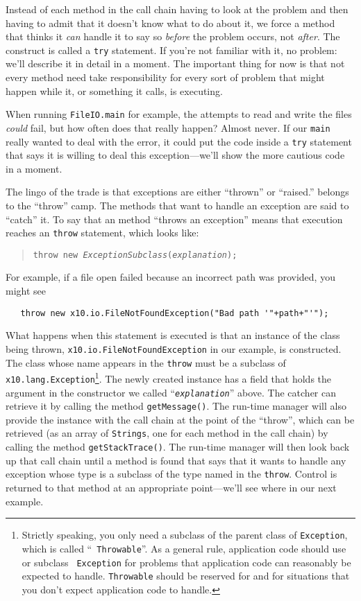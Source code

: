 Instead of each method in the call chain having to look at the
problem and then having to admit that it doesn't know what to do
about it, we force a method that thinks it {\em can} handle it to say so {\em before}
the problem occurs, not {\em after}. The
construct is called a {\tt try} statement.  If you're not familiar with
it, no problem: we'll describe it in detail in a moment.  The important thing
for now is that not every method need take responsibility for every sort of
problem that might happen while it, or something it calls, is executing.

When running {\tt FileIO.main} for example, the attempts to read and write the
files {\em could} fail, but how often does that really happen? Almost never.
If our {\tt main} really wanted to deal with the
error, it could put the code inside a {\tt try} statement that says it is
willing to deal this exception---we'll show the more cautious code in a
moment.

The lingo of the trade is that exceptions are either ``thrown'' or ``raised.'' 
\Xten{} belongs to the ``throw'' camp.  The methods that want to handle an
exception are said to ``catch'' it.
To say that an \Xten{} method ``throws an exception'' means that execution
reaches an \Xten{} {\tt throw} statement, which looks like:
\begin{quote}
{\tt throw new {\em ExceptionSubclass}({\em explanation});}
\end{quote}
For example, if a file open failed because an incorrect path was provided, you
might see
\begin{verbatim}
   throw new x10.io.FileNotFoundException("Bad path '"+path+"'");
\end{verbatim}
What happens when this statement is executed is that an instance of the
class being thrown, {\tt x10.io.FileNotFoundException} in our example,
is constructed.  The class whose name appears in the {\tt throw} must be a
subclass of {\tt x10.lang.Exception}\footnote{Strictly speaking,  you only need
a subclass of the parent class of {\tt Exception}, which is called ``{\tt
Throwable}''.  As a general rule, application code should use or subclass {\tt
Exception} for problems that application code can reasonably be expected to
handle.  {\tt Throwable} should be reserved for \Xten{} and for situations that
you don't expect application code to handle.}.
The newly created instance has a field that holds the argument in the
constructor we called ``{\tt{\em explanation}}'' above.
The catcher can retrieve it by calling the
method {\tt getMessage()}.  The \Xten{} run-time manager will also provide the
instance with the call chain at the point of the ``throw'', which can be
retrieved (as an array of {\tt Strings}, one for each method in the call chain)
by calling the method {\tt getStackTrace()}.  The \Xten{} run-time manager will
then look back up that call chain until a method is found that says that it
wants to handle any exception whose type is a
subclass of the type named in the {\tt throw}.  Control is returned to that
method at an appropriate point---we'll see where in our next example.

